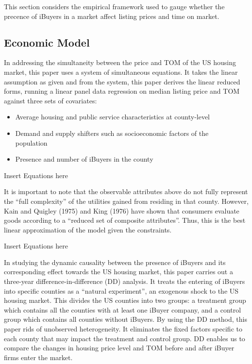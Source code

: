 This section considers the empirical framework used to gauge whether the precence of iBuyers in a market affect listing prices and time on market. 

\subsection{Economic Model}

In addressing the simultaneity between the price and TOM of the US housing market, this paper uses a system of simultaneous equations. It takes the linear assumption as given and from the system, this paper derives the linear reduced forms, running a linear panel data regression on median listing price and TOM against three sets of covariates: 

\begin{itemize}

    \item  Average housing and public service characteristics at county-level  

    \item  Demand and supply shifters such as socioeconomic factors of the population  

    \item  Presence and number of iBuyers in the county 

\end{itemize}

Insert Equations here  

It is important to note that the observable attributes above do not fully represent the “full complexity” of the utilities gained from residing in that county. However, Kain and Quigley (1975) \cite{KQ} and King (1976) \cite{King} have shown that consumers evaluate goods according to a “reduced set of composite attributes”. Thus, this is the best linear approximation of the model given the constraints.  

Insert Equations here  

In studying the dynamic causality between the presence of iBuyers and its corresponding effect towards the US housing market, this paper carries out a three-year difference-in-difference (DD) analysis. It treats the entering of iBuyers into specific counties as a “natural experiment”, an exogenous shock to the US housing market. This divides the US counties into two groups: a treatment group which contains all the counties with at least one iBuyer company, and a control group which contains all counties without iBuyers. By using the DD method, this paper rids of unobserved heterogeneity. It eliminates the fixed factors specific to each county that may impact the treatment and control group. DD enables us to compare the changes in housing price level and TOM before and after iBuyer firms enter the market.  

